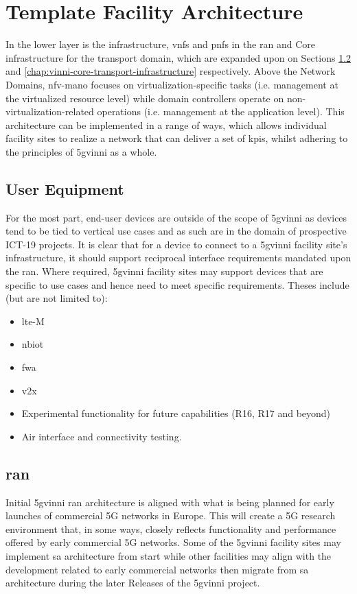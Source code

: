 \section{Template Facility Architecture}
In the lower layer is the infrastructure, \acrshort{vnf}s and \acrshort{pnf}s in the \acrshort{ran} and Core infrastructure for the transport domain, which are expanded upon on Sections \ref{chap:vinni-ran} and \ref{chap:vinni-core-transport-infrastructure} respectively. 
Above the Network Domains, \acrshort{nfv}-\acrshort{mano} focuses on virtualization-specific tasks (i.e. management at the virtualized resource level) while domain controllers operate on non-virtualization-related operations (i.e. management at the application level). This architecture can be implemented in a range of ways, which allows individual facility sites to realize a network that can deliver a set of \acrshort{kpi}s, whilst adhering to the principles of \acrshort{5gvinni} as a whole.

    \subsection{User Equipment}
    For the most part, end-user devices are outside of the scope of \acrshort{5gvinni} as devices tend to be tied to vertical use cases and as such are in the domain of prospective ICT-19 projects. It is clear that for a device to connect to a \acrshort{5gvinni} facility site’s infrastructure, it should support reciprocal interface requirements mandated upon the \acrshort{ran}. Where required, \acrshort{5gvinni} facility sites may support devices that are specific to use cases and hence need to meet specific requirements. Theses include (but are not limited to):
    
    \begin{itemize}
        \item \acrshort{lte}-M
        \item \acrfull{nbiot}
        \item \acrfull{fwa} 
        \item \acrfull{v2x}
        \item Experimental functionality for future capabilities (R16, R17 and beyond)
        \item Air interface and connectivity testing.
    \end{itemize}
    
    \subsection{\acrfull{ran}}
    \label{chap:vinni-ran}
    Initial \acrshort{5gvinni} \acrshort{ran} architecture is aligned with what is being planned for early launches of commercial 5G networks in Europe. This will create a 5G research environment that, in some ways, closely reflects functionality and performance offered by early commercial 5G networks. Some of the \acrshort{5gvinni} facility sites may implement \acrshort{sa} architecture from start while other facilities may align with the development related to early commercial networks then migrate from \acrshort{sa} architecture during the later Releases of the \acrshort{5gvinni} project. 
    
